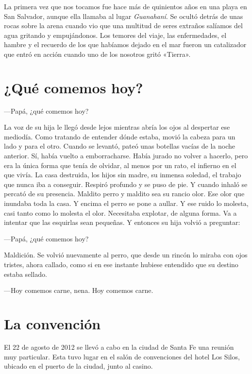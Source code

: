 \documentclass[11pt,twoside,openright,a6paper]{book}
\begin{document}
La primera vez que nos tocamos fue hace más de quinientos años en una playa en San Salvador, aunque ella llamaba al lugar \emph{Guanahaní}. Se ocultó detrás de unas rocas sobre la arena cuando vio que una multitud de seres extraños salíamos del agua gritando y empujándonos. Los temores del viaje, las enfermedades, el hambre y el recuerdo de los que habíamos dejado en el mar fueron un catalizador que entró en acción cuando uno de los nosotros gritó «Tierra».

\chapter*{¿Qué comemos hoy?}

---Papá, ¿qué comemos hoy?

La voz de su hija le llegó desde lejos mientras abría los ojos al despertar ese mediodía. Como tratando de entender dónde estaba, movió la cabeza para un lado y para el otro. Cuando se levantó, pateó unas botellas vacías de la noche anterior. Sí, había vuelto a emborracharse. Había jurado no volver a hacerlo, pero era la única forma que tenía de olvidar, al menos por un rato, el infierno en el que vivía. La casa destruida, los hijos sin madre, su inmensa soledad, el trabajo que nunca iba a conseguir. Respiró profundo y se puso de pie. Y cuando inhaló se percató de su presencia. Maldito perro y maldito sea su rancio olor. Ese olor que inundaba toda la casa. Y encima el perro se pone a aullar. Y ese ruido lo molesta, casi tanto como lo molesta el olor. Necesitaba explotar, de alguna forma. Va a intentar que las esquirlas sean pequeñas.
Y entonces su hija volvió a preguntar:

---Papá, ¿qué comemos hoy?

Maldición. Se volvió nuevamente al perro, que desde un rincón lo miraba con ojos tristes, ahora callado, como si en ese instante hubiese entendido que su destino estaba sellado.

---Hoy comemos carne, nena. Hoy come\-mos carne.


\chapter*{La convención}

El 22 de agosto de 2012 se llevó a cabo en la ciudad de Santa Fe una reunión muy particular. Esta tuvo lugar en el salón de convenciones del hotel Los Silos, ubicado en el puerto de la ciudad, junto al casino.
\end{document}
